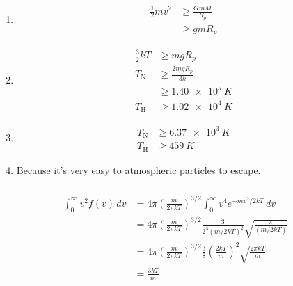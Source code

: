 \documentclass{article}
\begin{document}
\begin{enumerate}
  \item

        \begin{align*}
          \frac{1}{2} m v^2 & \ge \frac{G m M}{R_p} \\
                            & \ge g m R_p
        \end{align*}

  \item

        \begin{align*}
          \frac{3}{2} k T & \ge m g R_p               \\
          T_\text{N}      & \ge \frac{2 m g R_p}{3 k} \\
                          & \ge \qty{1.40e5}{K}       \\
          T_\text{H}      & \ge \qty{1.02e4}{K}
        \end{align*}

  \item

        \begin{align*}
          T_\text{N} & \ge \qty{6.37e3}{K} \\
          T_\text{H} & \ge \qty{459}{K}
        \end{align*}

  \item Because it's very easy to atmospheric particles to escape.
\end{enumerate}

\setcounter{subsubsection}{72}
\subsubsection{}

\begin{align*}
  \int_0^\infty v^2 f(v) \,dv & = 4 \pi \left( \frac{m}{2 \pi k T} \right)^{3 / 2} \int_0^\infty v^4 e^{-m v^2 / 2 k T} \,dv                               \\
                              & = 4 \pi \left( \frac{m}{2 \pi k T} \right)^{3 / 2} \frac{3}{2^3 (m / 2 k T)^2} \sqrt{\frac{\pi}{(m / 2 k T)}}              \\
                              & = 4 \pi \left( \frac{m}{2 \pi k T} \right)^{3 / 2} \frac{3}{8} \left( \frac{2 k T}{m} \right)^2 \sqrt{\frac{2 \pi k T}{m}} \\
                              & = \frac{3 k T}{m}
\end{align*}
\end{document}
